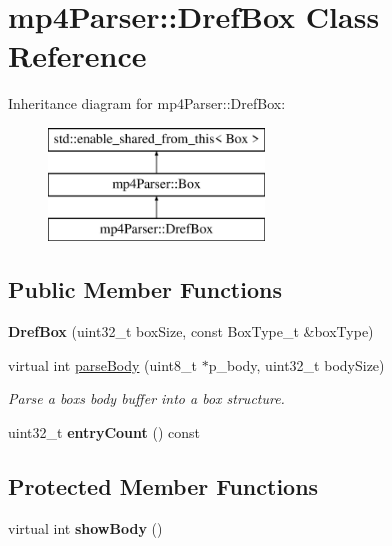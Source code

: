 \hypertarget{classmp4_parser_1_1_dref_box}{}\section{mp4\+Parser\+::Dref\+Box Class Reference}
\label{classmp4_parser_1_1_dref_box}
Inheritance diagram for mp4\+Parser\+::Dref\+Box\+:\begin{figure}[H]
\begin{center}
\leavevmode
\includegraphics[height=3.000000cm]{classmp4_parser_1_1_dref_box}
\end{center}
\end{figure}
\subsection*{Public Member Functions}
\begin{DoxyCompactItemize}
\item 
\mbox{\label{classmp4_parser_1_1_dref_box_a15f938334b7ae3a390b9a16ac80bbad2}} 
{\bfseries Dref\+Box} (uint32\+\_\+t box\+Size, const Box\+Type\+\_\+t \&box\+Type)
\item 
virtual int \mbox{\hyperlink{classmp4_parser_1_1_dref_box_a47453502638fb6c179a0acae567396e4}{parse\+Body}} (uint8\+\_\+t $\ast$p\+\_\+body, uint32\+\_\+t body\+Size)
\begin{DoxyCompactList}\small\item\em Parse a box\textquotesingle{}s body buffer into a box structure. \end{DoxyCompactList}\item 
\mbox{\label{classmp4_parser_1_1_dref_box_ae443c2001c46925ff6590ecb021ba53b}} 
uint32\+\_\+t {\bfseries entry\+Count} () const
\end{DoxyCompactItemize}
\subsection*{Protected Member Functions}
\begin{DoxyCompactItemize}
\item 
\mbox{\label{classmp4_parser_1_1_dref_box_ad512c8d3e1094e708db0f583be89bea5}} 
virtual int {\bfseries show\+Body} ()
\end{DoxyCompactItemize}
